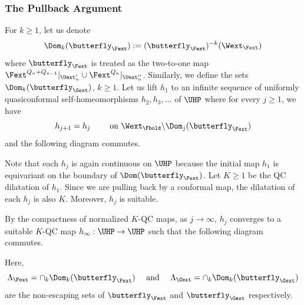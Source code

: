 \documentclass{amsart}
\begin{document}
\subsubsection{The Pullback Argument}\label{sss:PA} For $k \geq 1$, let us denote 
\[
\Dom_k(\butterfly_{\Fext}) := (\butterfly_{\Fext})^{-k}(\Wext_{\Fext})
\]
where $\butterfly_{\Fext}$ is treated as the two-to-one map $\Fext^{Q_n+Q_{n-1}}|_{\Uext'_n} \cup \Fext^{Q_n}|_{\Uext''_n}$. 
Similarly, we define the sets $\Dom_k(\butterfly_{\Gext})$, $k \geq 1$. 
Let us lift $h_1$ to an infinite sequence of uniformly quasiconformal self-homeomorphisms $h_2, h_3,\ldots $ of $\UHP$ where for every $j \geq 1$, we have 
\[
h_{j+1} = h_j \qquad \text{ on } \Wext_{\Fbold} \backslash \Dom_j(\butterfly_{\Fext})
\]
and the following diagram commutes.
\begin{center}
\end{center}
Note that each $h_j$ is again continuous on $\UHP$ because the initial map $h_1$ is equivariant on the boundary of $\Dom(\butterfly_{\Fext})$. 
Let $K \geq 1$ be the QC dilatation of $h_1$. 
Since we are pulling back by a conformal map, the dilatation of each $h_j$ is also $K$. 
Moreover, $h_j$ is suitable.

By the compactness of normalized $K$-QC maps, as $j \to \infty$,
$h_j$ converges to a suitable $K$-QC map $h_\infty: \UHP \to \UHP$ such that the following diagram commutes.
\begin{center}
\end{center}
Here, 
\[
\Lambda_{\Fext} = \cap_k \Dom_k(\butterfly_{\Fext})
\quad \text{ and } \quad
\Lambda_{\Gext} = \cap_k \Dom_k(\butterfly_{\Gext})
\]
are the non-escaping sets of $\butterfly_\Fext$ and $\butterfly_\Gext$ respectively.
\end{document}
